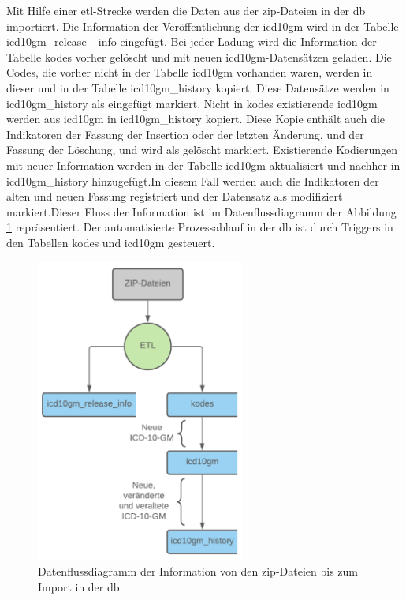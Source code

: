 Mit Hilfe einer \ac{etl}-Strecke werden die Daten aus der \ac{zip}-Dateien in der \ac{db} importiert. Die Information der Veröffentlichung der \ac{icd10gm} wird in der Tabelle \textsf{icd10gm\_release \_info} eingefügt. Bei jeder Ladung wird die Information der Tabelle \textsf{kodes} vorher gelöscht und mit neuen \ac{icd10gm}-Datensätzen geladen. Die Codes, die vorher nicht in der Tabelle \textsf{icd10gm} vorhanden waren, werden in dieser und in der Tabelle \textsf{icd10gm\_history} kopiert. Diese Datensätze werden in \textsf{icd10gm\_history} als eingefügt markiert. Nicht in \textsf{kodes} existierende \ac{icd10gm} werden aus \textsf{icd10gm} in \textsf{icd10gm\_history} kopiert. Diese Kopie enthält auch die Indikatoren der Fassung der Insertion oder der letzten Änderung, und der Fassung der Löschung, und wird als gelöscht markiert. Existierende Kodierungen mit neuer Information werden in der Tabelle \textsf{icd10gm} aktualisiert und nachher in \textsf{icd10gm\_history} hinzugefügt.In diesem Fall werden auch die Indikatoren der alten und neuen Fassung registriert und der Datensatz als modifiziert markiert.Dieser Fluss der Information ist im Datenflussdiagramm der Abbildung \ref{fig:dbflow} repräsentiert. Der automatisierte Prozessablauf in der \ac{db} ist durch Triggers in den Tabellen \textsf{kodes} und \textsf{icd10gm} gesteuert.

\begin{figure}[ht]
	\centering
	\includegraphics[height=10cm]{figures/dbflow}
	\caption[Datenfluss des Prozesses]{Datenflussdiagramm der Information von den \ac{zip}-Dateien bis zum Import in der \ac{db}.}
	\label{fig:dbflow}
\end{figure} 